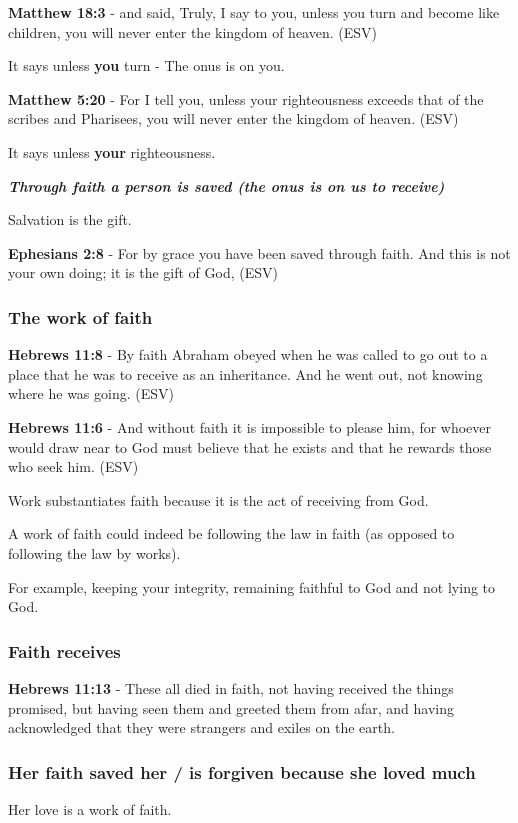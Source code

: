 \documentclass[11pt]{article}
\begin{document}
\textbf{Matthew 18:3} -  and said, Truly, I say to you, unless you turn and become like children, you will never enter the kingdom of heaven.  (ESV)

It says unless \textbf{you} turn - The onus is on you.

\textbf{Matthew 5:20} - For I tell you, unless your righteousness exceeds that of the scribes and Pharisees, you will never enter the kingdom of heaven. (ESV)

It says unless \textbf{your} righteousness.

\emph{\textbf{Through faith a person is saved (the onus is on us to receive)}}

Salvation is the gift.

\textbf{Ephesians 2:8} - For by grace you have been saved through faith.  And this is not your own doing; it is the gift of God,  (ESV)

\subsubsection{The work of faith}
\label{sec:org4a23c17}
\textbf{Hebrews 11:8} - By faith Abraham obeyed when he was called to go out to a place that he was to receive as an inheritance. And he went out, not knowing where he was going. (ESV)

\textbf{Hebrews 11:6} - And without faith it is impossible to please him, for whoever would draw near to God must believe that he exists and that he rewards those who seek him. (ESV)

Work substantiates faith because it is the act of receiving from God.

A work of faith could indeed be following the law in faith (as opposed to following the law by works).

For example, keeping your integrity, remaining faithful to God and not lying to God.

\subsubsection{Faith receives}
\label{sec:org1d8a5d1}
\textbf{Hebrews 11:13} - These all died in faith, not having received the things promised, but having seen them and greeted them from afar, and having acknowledged that they were strangers and exiles on the earth.

\subsubsection{Her faith saved her / is forgiven because she loved much}
\label{sec:orga66f093}
Her love is a work of faith.
\end{document}
